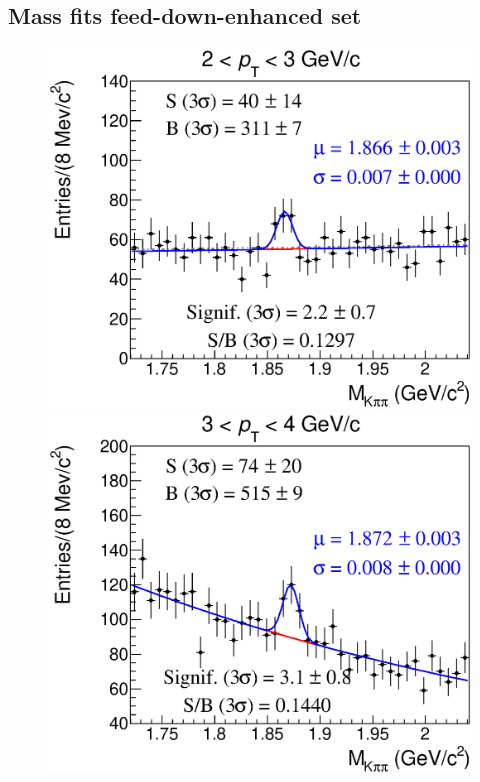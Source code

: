 \documentclass[b5paper,10pt,twoside,oldstyle,classica]{toptesi}
\begin{document}
\subsection{Mass fits feed-down-enhanced set}
\begin{figure}[h]
\begin{center}
{\includegraphics[scale = 0.25]{MassFitSet3_Pt0.eps}}
\hspace{0cm}
{\includegraphics[scale = 0.25]{MassFitSet3_Pt1.eps}}
\vspace{0cm}

\end{center}
\end{figure}
\end{document}
